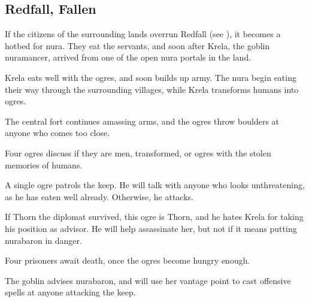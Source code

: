 \subsection{Redfall, Fallen}
\label{redfallFallen}


If the citizens of the surrounding lands overrun Redfall (see ), it becomes a hotbed for nura.
They eat the servants, and soon after Krela, the goblin nuramancer, arrived from one of the open nura portals in the land.

Krela eats well with the \glspl{ogre}, and soon builds up  army.
The nura begin eating their way through the surrounding \glspl{village}, while Krela transforms humans into \glspl{ogre}.

The central fort continues amassing arms, and the \glspl{ogre} throw boulders at anyone who comes too close.


Four \glspl{ogre} discuss if they are men, transformed, or \glspl{ogre} with the stolen memories of humans.



A single \gls{ogre} patrols the keep.
He will talk with anyone who looks unthreatening, as he has eaten well already.
Otherwise, he attacks.

If Thorn the diplomat survived, this \gls{ogre} is Thorn, and he hates Krela for taking his position as advisor.
He will help assassinate her, but not if it means putting \gls{nurabaron} in danger.



Four prisoners await death, once the \glspl{ogre} become hungry enough.


The goblin advises \gls{nurabaron}, and will use her vantage point to cast offensive spells at anyone attacking the keep.
